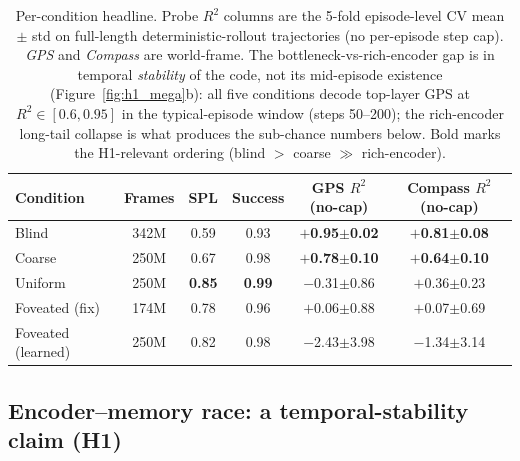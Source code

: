 \documentclass{article}
\begin{document}
\begin{table}[!htbp]
\centering
\small
\setlength{\tabcolsep}{6pt}
\caption{Per-condition headline. Probe $R^2$ columns are the 5-fold episode-level CV mean $\pm$ std on full-length deterministic-rollout trajectories (no per-episode step cap). \emph{GPS} and \emph{Compass} are world-frame. The bottleneck-vs-rich-encoder gap is in temporal \emph{stability} of the code, not its mid-episode existence (Figure~\ref{fig:h1_mega}b): all five conditions decode top-layer GPS at $R^2 \in [0.6, 0.95]$ in the typical-episode window (steps 50--200); the rich-encoder long-tail collapse is what produces the sub-chance numbers below. Bold marks the H1-relevant ordering (blind $>$ coarse $\gg$ rich-encoder).}
\label{tab:summary}
\begin{tabular}{lccccc}
\toprule
Condition & Frames & SPL & Success & GPS $R^2$ (no-cap) & Compass $R^2$ (no-cap) \\
\midrule
Blind                 & 342M  & 0.59          & 0.93          & \textbf{$+$0.95$\pm$0.02} & \textbf{$+$0.81$\pm$0.08} \\
Coarse       & 250M  & 0.67          & 0.98          & \textbf{$+$0.78$\pm$0.10} & \textbf{$+$0.64$\pm$0.10} \\
Uniform               & 250M  & \textbf{0.85} & \textbf{0.99} & $-$0.31$\pm$0.86          & $+$0.36$\pm$0.23 \\
Foveated (fix)        & 174M  & 0.78          & 0.96          & $+$0.06$\pm$0.88          & $+$0.07$\pm$0.69 \\
Foveated (learned)           & 250M  & 0.82          & 0.98          & $-$2.43$\pm$3.98          & $-$1.34$\pm$3.14 \\
\bottomrule
\end{tabular}
\end{table}


\subsection{Encoder--memory race: a temporal-stability claim (H1)}
\label{sec:h1}
\end{document}
